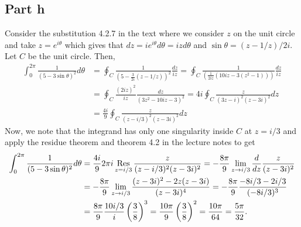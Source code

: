 \documentclass{article}
\begin{document}
\subsection{Part h}
Consider the substitution 4.2.7 in the text where we consider $z$ on the unit circle and take $z=e^{i\theta}$ which gives that $dz=ie^{i\theta}d\theta=izd\theta$ and $\sin\theta=(z-1/z)/2i$. Let $C$ be the unit circle. Then, 
\begin{align*}
\int_0^{2 \pi} \frac{1}{(5 - 3 \sin\theta)^2} d \theta&=\oint_C\frac{1}{(5-\frac{3}{2i}(z-1/z))^2}\frac{dz}{iz}=\oint_C\frac{1}{\left(\frac{1}{2iz}(10iz-3(z^2-1))\right)}\frac{dz}{iz}\\&=
\oint_C\frac{(2iz)^2}{iz}\frac{dz}{(3z^2-10iz-3)^2}=4i\oint_C\frac{z}{(3z-i)^2(z-3i)^2}dz\\&=
\frac{4i}{9}\oint_C\frac{z}{(z-i/3)^2(z-3i)^2}dz
\end{align*}
Now, we note that the integrand has only one singularity inside $C$ at $z=i/3$ and apply the residue theorem and theorem 4.2 in the lecture notes to get 
\begin{align*}
\int_0^{2 \pi} \frac{1}{(5 - 3 \sin\theta)^2} d\theta&=\frac{4i}{9}2\pi i\operatorname*{Res}_{z=i/3}\frac{z}{(z-i/3)^2(z-3i)^2}=-\frac{8\pi}{9}\lim_{z\to i/3}\frac{d}{dz}\frac{z}{(z-3i)^2}\\&=
-\frac{8\pi}{9}\lim_{z\to i/3}\frac{(z-3i)^2-2z(z-3i)}{(z-3i)^4}=-\frac{8\pi}{9}\frac{-8i/3-2i/3}{(-8i/3)^3}\\&=
\frac{8\pi}{9}\frac{10i/3}{i}\left(\frac{3}{8}\right)^3=\frac{10\pi}{9}\left(\frac{3}{8}\right)^2=\frac{10\pi}{64}=\frac{5\pi}{32}.
\end{align*}
\end{document}
